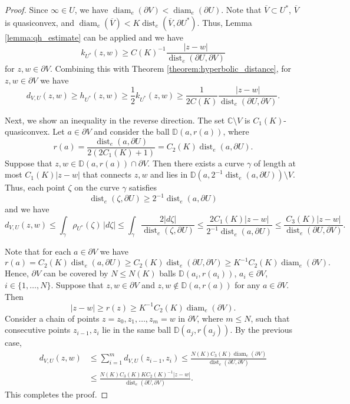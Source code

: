\documentclass[letterpaper]{amsart}
\theoremstyle{plain}
\theoremstyle{definition}
\theoremstyle{remark}
\numberwithin{equation}{section}
\numberwithin{theorem}{section}
\renewcommand{\bar}{\overline}
\newcommand{\C}{\mathbb C}
\newcommand{\D}{\mathbb D}
\DeclareMathOperator{\dist}{dist}
\DeclareMathOperator{\diam}{diam}
\begin{document}
\begin{proof}
Since $\infty \in U$, we have $\diam_e(\partial V)<\diam_e(\partial U)$. 
Note that $\bar V\subset U^*$, $\bar V$ is quasiconvex, and $\diam_e(\bar V)< K\dist_e(\bar V,\partial U^*)$. Thus, Lemma \ref{lemma:qh_estimate} can be applied and we have
$$k_{U^*}(z,w) \geq C(K)^{-1}\frac{|z-w|}{\dist_e(\partial U,\partial V)}$$
for $z,w\in \partial V$. Combining this with Theorem \ref{theorem:hyperbolic_distance}, for $z,w\in \partial V$ we have
$$d_{V,U}(z,w)\geq h_{U^*}(z,w) \geq \frac{1}{2} k_{U^*}(z,w)\geq \frac{1}{2C(K)}\frac{|z-w|}{\dist_e(\partial U,\partial V)}.$$

Next, we show an inequality in the reverse direction. The set $\C\setminus V$ is $C_1(K)$-quasiconvex. Let $a\in \partial V$ and consider the ball $\D(a, r(a))$, where 
$$r(a)=\frac{\dist_e(a,\partial U)}{2(2C_1(K)+1)}=C_2(K) \dist_e(a,\partial U).$$
Suppose that $z,w\in \D(a,r(a))\cap \partial V$. Then there exists a curve $\gamma$ of length at most $C_1(K)|z-w|$ that connects $z,w$ and lies in $\D(a,2^{-1}\dist_e(a,\partial U))\setminus V$. Thus, each point $\zeta$ on the curve $\gamma$ satisfies
$$\dist_e(\zeta,\partial U)\geq 2^{-1}\dist_e(a,\partial U)$$
and we have
$$d_{V,U}(z,w)\leq \int_\gamma \rho_{U^*}(\zeta)\,|d\zeta|\leq \int_\gamma \frac{2|d\zeta|}{\dist_e(\zeta,\partial U)}\leq  \frac{2C_1(K)|z-w|}{2^{-1}\dist_e(a,\partial U)}\leq  \frac{C_3(K)|z-w|}{\dist_e(\partial U,\partial V)}.$$

Note that for each $a\in \partial V$ we have
$$r(a)=C_2(K)\dist_e(a,\partial U) \geq C_2(K)\dist_e(\partial U,\partial V) \geq K^{-1}C_2(K)\diam_e(\partial V).$$
Hence, $\partial V$ can be covered by $N\leq N(K)$ balls $\D(a_i,r(a_i))$, $a_i\in \partial V$, $i\in \{1,\dots,N\}$. Suppose that $z,w\in \partial V$ and $z,w\notin \D(a,r(a))$ for any $a\in \partial V$. Then 
$$|z-w|\geq r(z)\geq K^{-1}C_2(K)\diam_e(\partial V).$$
Consider a chain of points $z=z_0,z_1,\dots,z_m=w$ in $\partial V$, where $m\leq N$, such that consecutive points $z_{i-1},z_i$ lie in the same ball $\D(a_j,r(a_j))$. By the previous case,
\begin{align*}
d_{V,U}(z,w)&\leq \sum_{i=1}^m d_{V,U}(z_{i-1},z_i)\leq \frac{N(K)C_3(K)\diam_e(\partial V)}{\dist_e(\partial U,\partial V)}\\
&\leq \frac{N(K)C_3(K)KC_2(K)^{-1}|z-w|}{\dist_e(\partial U,\partial V)}.
\end{align*}
This completes the proof.
\end{proof}
\end{document}
